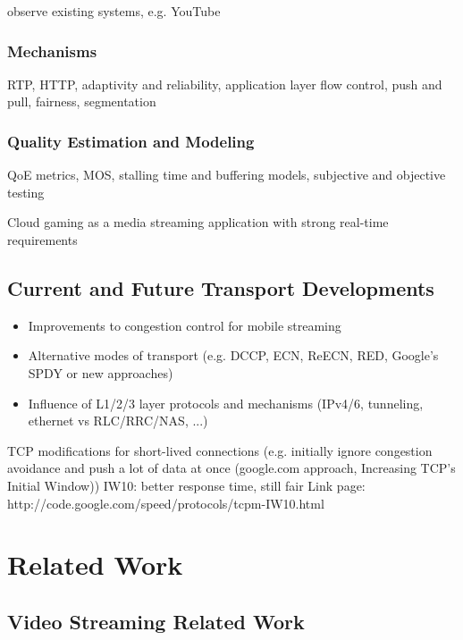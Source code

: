 observe existing systems, e.g. YouTube \cite{metzger2011delivery}

\subsubsection{Mechanisms}
RTP, HTTP, adaptivity and reliability, application layer flow control, push and pull, fairness, segmentation
\subsubsection{Quality Estimation and Modeling}
QoE metrics, MOS, stalling time and buffering models, subjective and objective testing


Cloud gaming as a media streaming application with strong real-time requirements \cite{4795441,wang2009modeling,jarschel2011cloudevaluation,ct2010wolken}



\subsection{Current and Future Transport Developments}

\begin{itemize}
\item Improvements to congestion control for mobile streaming
\item Alternative modes of transport (e.g. DCCP, ECN, ReECN, RED, Google's SPDY or new approaches)
\item Influence of L1/2/3 layer protocols and mechanisms (IPv4/6, tunneling, ethernet vs RLC/RRC/NAS, ...) %

\end{itemize}


TCP modifications for short-lived connections (e.g. initially ignore congestion avoidance and push a lot of data at once (google.com approach, Increasing TCP's Initial Window)) 
IW10: better response time, still fair
Link page: http://code.google.com/speed/protocols/tcpm-IW10.html

\section{Related Work}

\subsection{Video Streaming Related Work}

